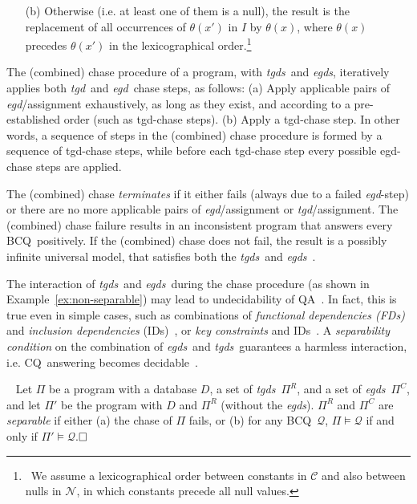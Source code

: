 \documentclass[format=acmsmall, review=false, screen=true]{acmart}
\newcommand{\bcq}{BCQ}
\newcommand{\cq}{CQ}
\newcommand{\boxtheorem}{\ensuremath{\hfill \Box}}
\newcommand{\mc}[1]{\mathcal{ #1}}
\newcommand{\rules}{\Pi^{R}}
\newcommand{\constraints}{\Pi^{C}}
\newcommand{\prg}{\Pi}
\newcommand{\qa}{QA}
\newcommand{\fds}{FDs}
\newcommand{\ideps}{IDs}
\newcommand{\egds}{{\em egds}}
\newcommand{\egd}{{\em egd}}
\newcommand{\tgds}{{\em tgds}}
\newcommand{\tgd}{{\em tgd}}
\begin{document}
{\begin{itemize}
  \item[(b)] Otherwise (i.e. at least one of them is a null), the result is the replacement of all occurrences of $\theta(x')$ in $I$ by $\theta(x)$, where $\theta(x)$ precedes $\theta(x')$ in the lexicographical order.\footnote{\ We assume a lexicographical order between constants in $\mc{C}$ and also between nulls in $\mc{N}$, in which constants precede all null values.}
\end{itemize}

The (combined) chase procedure of a program, with \tgds \ and \egds, iteratively applies both \tgd \ and \egd \ chase steps, as follows: (a) Apply applicable pairs of \egd/assignment exhaustively, as long as they exist, and according to a pre-established order (such as tgd-chase steps). (b) Apply a tgd-chase step. In other words, a sequence of steps in the (combined) chase procedure is formed by a sequence of tgd-chase steps, while before each tgd-chase step every possible egd-chase steps are applied.

The (combined) chase {\em terminates} if it either fails (always due to a failed \egd-step) or there are no more applicable pairs of \egd/assignment or \tgd/assignment. The (combined) chase failure results in an inconsistent program that answers every \bcq \ positively. If the (combined) chase does not fail, the result is a possibly infinite universal model, that satisfies both the \tgds \ and \egds~\cite{cali13}.

The interaction of \tgds \ and \egds \ during the chase procedure (as shown in Example~\ref{ex:non-separable}) may lead to undecidability of \qa~\cite{beeri-icalp}. In fact, this is true even in simple cases, such as combinations of {\em functional dependencies (\fds)}  and {\em inclusion dependencies} (\ideps)~\cite{chandra}, or {\em key constraints} and \ideps~\cite{cali12}. A {\em separability condition} on the combination of \egds \ and \tgds \ guarantees a harmless interaction, i.e. \cq \ answering becomes decidable~\cite{cali12is,cali12}.

\begin{definition}[Separability]~\cite{cali12is}  Let $\prg$ be a program with a database $D$, a set of \tgds \ $\rules$, and a set of \egds \ $\constraints$, and let $\prg'$ be the program with $D$ and $\rules$ (without the \egds). $\rules$ and $\constraints$ are {\it separable} if either (a) the chase of $\prg$ fails, or (b) for any \bcq \ $\mc{Q}$, $\prg \models \mc{Q}$ if and only if $\prg' \models \mc{Q}$.\boxtheorem \end{definition}

}
\end{document}
